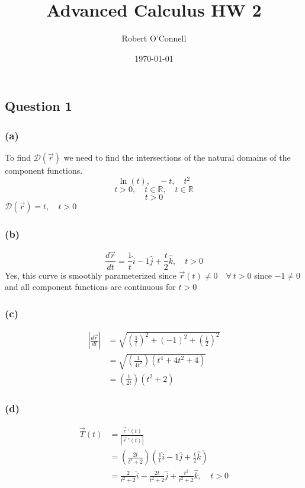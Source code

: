 \documentclass{article}
\title{\textbf{Advanced Calculus HW 2}}
\author{Robert O'Connell}
\date{\today}
\begin{document}
\maketitle
\vspace{5mm}

\subsection*{Question 1}

\subsubsection*{(a)}
To find \(\mathcal{D}(\vec{r})\) we need to find the intersections of the natural domains of the component
functions.
\[
\ln(t), \quad -t, \quad t^2
\]
\[
t>0, \quad t \in \mathbb{R}, \quad t \in \mathbb{R}
\]
\[
t > 0
\]
\(\mathcal{D}(\vec{r}) = t, \quad t > 0\)

\subsubsection*{(b)}
\[
\frac{d\vec{r}}{dt} = \frac{1}{t} \hat{i} -1 \hat{j} + \frac{t}{2} \hat{k}, \quad t > 0
\]
Yes, this curve is smoothly parameterized since \(\vec{r}(t) \neq 0 \quad \forall \ t > 0\) since \(-1 \neq 0\) and all component functions 
are continuous for \(t >0\)

\subsubsection*{(c)}
\begin{align*}
    \left|\frac{d\vec{r}}{dt}\right| &= \sqrt{\left(\frac{1}{t}\right)^2 + (-1)^2  + \left(\frac{t}{2}\right)^2} \\
    &= \sqrt{\left(\frac{1}{4t^2}\right)(t^4 + 4t^2 + 4)} \\
    &= \left(\frac{1}{2t}\right)(t^2 + 2)
\end{align*}

\subsubsection*{(d)}
\begin{align*}
    \vec{T}(t) &= \frac{\vec{r} \ '(t)}{|\vec{r} \ '(t)|} \\
    &= \left(\frac{2t}{t^2 + 2}\right)\left(\frac{1}{t} \hat{i} -1 \hat{j} + \frac{t}{2} \hat{k}\right) \\
    &= \frac{2}{t^2 + 2} \hat{i} -\frac{2t}{t^2 + 2} \hat{j} + \frac{t^2}{t^2 + 2} \hat{k}, \quad t>0
\end{align*}
\end{document}
